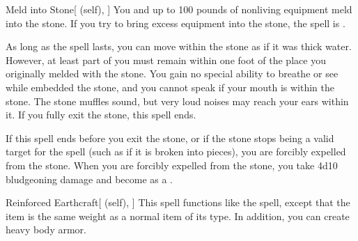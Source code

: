 \lowercase{\hypertarget{spell:Meld into Stone}{}}\label{spell:Meld into Stone}
\begin{attuneability}[Rank 3]{\hypertarget{spell:Meld into Stone}{Meld into Stone}}[ (self), ]
You and up to 100 pounds of nonliving equipment meld into the stone.
If you try to bring excess equipment into the stone, the spell is .

As long as the spell lasts, you can move within the stone as if it was thick water.
However, at least part of you must remain within one foot of the place you originally melded with the stone.
You gain no special ability to breathe or see while embedded the stone, and you cannot speak if your mouth is within the stone.
The stone muffles sound, but very loud noises may reach your ears within it.
If you fully exit the stone, this spell ends.

If this spell ends before you exit the stone, or if the stone stops being a valid target for the spell (such as if it is broken into pieces), you are forcibly expelled from the stone.
When you are forcibly expelled from the stone, you take 4d10 bludgeoning damage and become  as a .
\end{attuneability}
\vspace{0.25em}



\lowercase{\hypertarget{spell:Reinforced Earthcraft}{}}\label{spell:Reinforced Earthcraft}
\begin{attuneability}[Rank 3]{\hypertarget{spell:Reinforced Earthcraft}{Reinforced Earthcraft}}[ (self), ]
This spell functions like the  spell, except that the item is the same weight as a normal item of its type.
In addition, you can create heavy body armor.
\end{attuneability}
\vspace{0.25em}



